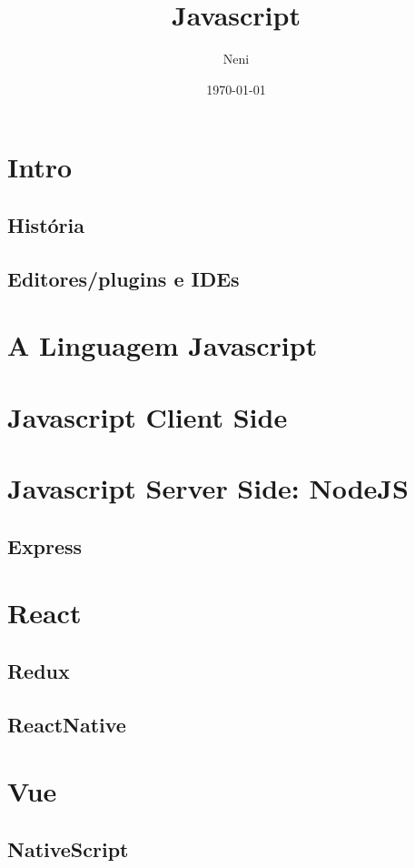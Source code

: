 \documentclass{apostila}
\title{Javascript}
\author{Neni}
\date{\today}
\begin{document}
\chapter{Intro}
\section{História}
\section{Editores/plugins e IDEs}




\chapter{A Linguagem Javascript}




\chapter{Javascript Client Side}




\chapter{Javascript Server Side: NodeJS}
\section{Express}




\chapter{React}
\section{Redux}
\section{ReactNative}




\chapter{Vue}
\section{NativeScript}


\end{document}
